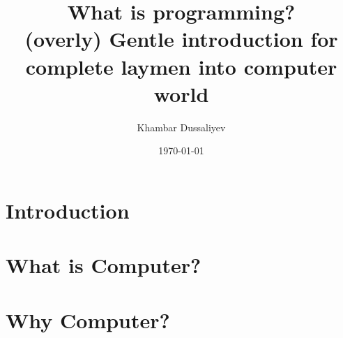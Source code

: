 \documentclass{report}
\title{
    What is programming? \\
    \large (overly) Gentle introduction for complete laymen into computer world
}
\author{Khambar Dussaliyev}
\date{\today}
\begin{document}
    \maketitle
    

    \newpage

    \tableofcontents

    \chapter{Introduction}\label{chapter:introduction}

        
        \newpage

    \chapter{What is Computer?}\label{chapter:what-is-computer}

        
        \newpage

    \chapter{Why Computer?}\label{chapter:why-computer}
        \newpage
\end{document}
